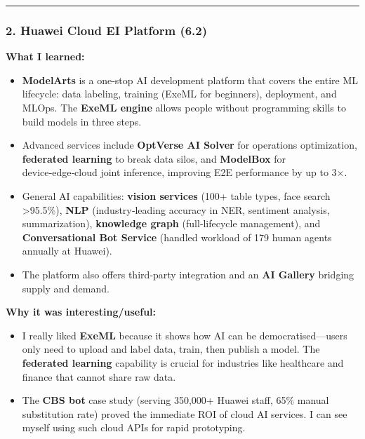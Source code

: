\begin{center}\rule{0.5\linewidth}{0.5pt}\end{center}

\hypertarget{huawei-cloud-ei-platform-6.2}{%
\subsubsection{2. Huawei Cloud EI Platform
(6.2)}\label{huawei-cloud-ei-platform-6.2}}

\textbf{What I learned:}

\begin{itemize}
\tightlist
\item
  \textbf{ModelArts} is a one‑stop AI development platform that covers
  the entire ML lifecycle: data labeling, training (ExeML for
  beginners), deployment, and MLOps. The \textbf{ExeML engine} allows
  people without programming skills to build models in three steps.
\item
  Advanced services include \textbf{OptVerse AI Solver} for operations
  optimization, \textbf{federated learning} to break data silos, and
  \textbf{ModelBox} for device‑edge‑cloud joint inference, improving E2E
  performance by up to 3×.
\item
  General AI capabilities: \textbf{vision services} (100+ table types,
  face search \textgreater95.5\%), \textbf{NLP} (industry‑leading
  accuracy in NER, sentiment analysis, summarization), \textbf{knowledge
  graph} (full‑lifecycle management), and \textbf{Conversational Bot
  Service} (handled workload of 179 human agents annually at Huawei).
\item
  The platform also offers third‑party integration and an \textbf{AI
  Gallery} bridging supply and demand.
\end{itemize}

\textbf{Why it was interesting/useful:}

\begin{itemize}
\tightlist
\item
  I really liked \textbf{ExeML} because it shows how AI can be
  democratised---users only need to upload and label data, train, then
  publish a model. The \textbf{federated learning} capability is crucial
  for industries like healthcare and finance that cannot share raw data.
\item
  The \textbf{CBS bot} case study (serving 350,000+ Huawei staff, 65\%
  manual substitution rate) proved the immediate ROI of cloud AI
  services. I can see myself using such cloud APIs for rapid
  prototyping.
\end{itemize}


